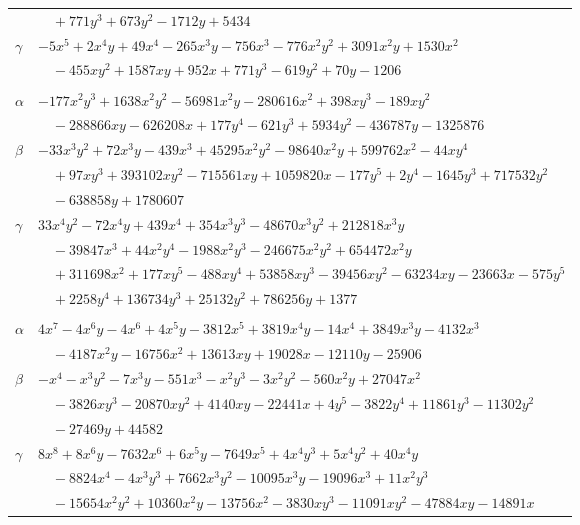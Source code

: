 \documentclass[11pt]{article}
\begin{document}
\begin{longtable}{@{}ll@{}}
 & $\quad +771y^{3}+673y^{2}-1712y+5434$\\
$\gamma$ & $-5x^{5}+2x^{4}y+49x^{4}-265x^{3}y-756x^{3}-776x^{2}y^{2}+3091x^{2}y+1530x^{2}$\\
 & $\quad -455xy^{2}+1587xy+952x+771y^{3}-619y^{2}+70y-1206$\\
\addlinespace[3pt]
\multicolumn{2}{@{}l}{$\{i,j\}=\{34,164\}$, $k_{ij}=2^{7}\cdot 3^{2}\cdot 7\cdot 13^{2}$}\\
$\alpha$ & $-177x^{2}y^{3}+1638x^{2}y^{2}-56981x^{2}y-280616x^{2}+398xy^{3}-189xy^{2}$\\
 & $\quad -288866xy-626208x+177y^{4}-621y^{3}+5934y^{2}-436787y-1325876$\\
$\beta$ & $-33x^{3}y^{2}+72x^{3}y-439x^{3}+45295x^{2}y^{2}-98640x^{2}y+599762x^{2}-44xy^{4}$\\
 & $\quad +97xy^{3}+393102xy^{2}-715561xy+1059820x-177y^{5}+2y^{4}-1645y^{3}+717532y^{2}$\\
 & $\quad -638858y+1780607$\\
$\gamma$ & $33x^{4}y^{2}-72x^{4}y+439x^{4}+354x^{3}y^{3}-48670x^{3}y^{2}+212818x^{3}y$\\
 & $\quad -39847x^{3}+44x^{2}y^{4}-1988x^{2}y^{3}-246675x^{2}y^{2}+654472x^{2}y$\\
 & $\quad +311698x^{2}+177xy^{5}-488xy^{4}+53858xy^{3}-39456xy^{2}-63234xy-23663x-575y^{5}$\\
 & $\quad +2258y^{4}+136734y^{3}+25132y^{2}+786256y+1377$\\
\addlinespace[3pt]
\multicolumn{2}{@{}l}{$\{i,j\}=\{34,171\}$, $k_{ij}=2^{7}\cdot 3\cdot 13$}\\
$\alpha$ & $4x^{7}-4x^{6}y-4x^{6}+4x^{5}y-3812x^{5}+3819x^{4}y-14x^{4}+3849x^{3}y-4132x^{3}$\\
 & $\quad -4187x^{2}y-16756x^{2}+13613xy+19028x-12110y-25906$\\
$\beta$ & $-x^{4}-x^{3}y^{2}-7x^{3}y-551x^{3}-x^{2}y^{3}-3x^{2}y^{2}-560x^{2}y+27047x^{2}$\\
 & $\quad -3826xy^{3}-20870xy^{2}+4140xy-22441x+4y^{5}-3822y^{4}+11861y^{3}-11302y^{2}$\\
 & $\quad -27469y+44582$\\
$\gamma$ & $8x^{8}+8x^{6}y-7632x^{6}+6x^{5}y-7649x^{5}+4x^{4}y^{3}+5x^{4}y^{2}+40x^{4}y$\\
 & $\quad -8824x^{4}-4x^{3}y^{3}+7662x^{3}y^{2}-10095x^{3}y-19096x^{3}+11x^{2}y^{3}$\\
 & $\quad -15654x^{2}y^{2}+10360x^{2}y-13756x^{2}-3830xy^{3}-11091xy^{2}-47884xy-14891x$\\

\end{longtable}
\end{document}
